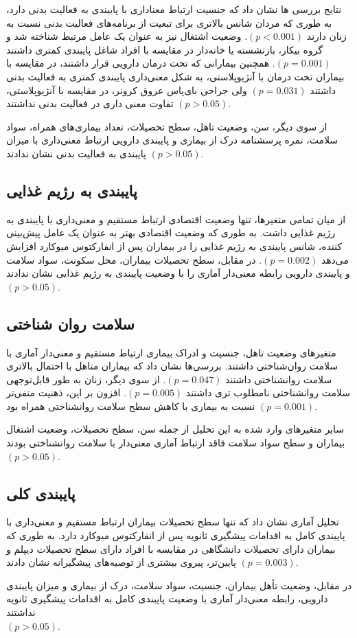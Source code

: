 نتایج بررسی ها نشان داد که جنسیت ارتباط معناداری با پایبندی به فعالیت بدنی دارد، به طوری که مردان شانس بالاتری برای تبعیت از برنامه‌های فعالیت بدنی نسبت به زنان دارند $(p<0.001)$. وضعیت اشتغال نیز به عنوان یک عامل مرتبط شناخته شد و گروه بیکار، بازنشسته یا خانه‌دار در مقایسه با افراد شاغل پایبندی کمتری داشتند $(p=0.001)$. همچنین بیمارانی که تحت درمان دارویی قرار داشتند، در مقایسه با بیماران تحت درمان با آنژیوپلاستی، به شکل معنی‌داری پایبندی کمتری به فعالیت بدنی داشتند $(p=0.031)$ ولی جراحی بای‌پاس عروق کرونر، در مقایسه با آنژیوپلاستی، تفاوت معنی داری در فعالیت بدنی نداشتند $(p>0.05)$.

از سوی دیگر، سن، وضعیت تاهل، سطح تحصیلات، تعداد بیماری‌های همراه، سواد سلامت، نمره پرسشنامه درک از بیماری و پایبندی دارویی ارتباط معنی‌داری با میزان پایبندی به فعالیت بدنی نشان ندادند $(p>0.05)$.




\subsection*{\textbf{پایبندی به رژیم غذایی}}


از میان تمامی متغیرها، تنها وضعیت اقتصادی ارتباط مستقیم و معنی‌داری با پایبندی به رژیم غذایی داشت. به طوری که وضعیت اقتصادی بهتر به عنوان یک عامل پیش‌بینی کننده، شانس پایبندی به رژیم غذایی را در بیماران پس از انفارکتوس میوکارد افزایش می‌دهد $(p=0.002)$.
در مقابل، سطح تحصیلات بیماران، محل سکونت، سواد سلامت و پایبندی دارویی رابطه معنی‌دار آماری را با وضعیت پایبندی به رژیم غذایی نشان ندادند $(p>0.05)$.



\subsection*{\textbf{سلامت روان شناختی}}


متغیرهای وضعیت تاهل، جنسیت و ادراک بیماری ارتباط مستقیم و معنی‌دار آماری با سلامت روان‌شناختی داشتند. بررسی‌ها نشان داد که بیماران متاهل با احتمال بالاتری سلامت روانشناختی داشتند $(p=0.047)$. از سوی دیگر، زنان به طور قابل‌توجهی سلامت روانشناختی نا‌مطلوب تری داشتند $(p=0.005)$. افزون بر این، ذهنیت منفی‌تر نسبت به بیماری با کاهش سطح سلامت روانشناختی همراه بود $(p=0.001)$.

سایر متغیرهای وارد شده به این تحلیل از جمله سن، سطح تحصیلات، وضعیت اشتغال بیماران و سطح سواد سلامت فاقد ارتباط آماری معنی‌دار با سلامت روانشناختی بودند $(p>0.05)$.


\subsection*{\textbf{پایبندی کلی}}


تحلیل آماری نشان داد که تنها سطح تحصیلات بیماران ارتباط مستقیم و معنی‌داری با پایبندی کامل به اقدامات پیشگیری ثانویه پس از انفارکتوس میوکارد دارد. به طوری که بیماران دارای تحصیلات دانشگاهی در مقایسه با افراد دارای سطح تحصیلات دیپلم و پایین‌تر، پیروی بیشتری از توصیه‌های پیشگیرانه نشان دادند $(p=0.003)$.

در مقابل، وضعیت تأهل بیماران، جنسیت، سواد سلامت، درک از بیماری و میزان پایبندی دارویی، رابطه معنی‌دار آماری با وضعیت پایبندی کامل به اقدامات پیشگیری ثانویه نداشتند \\$(p>0.05)$.

